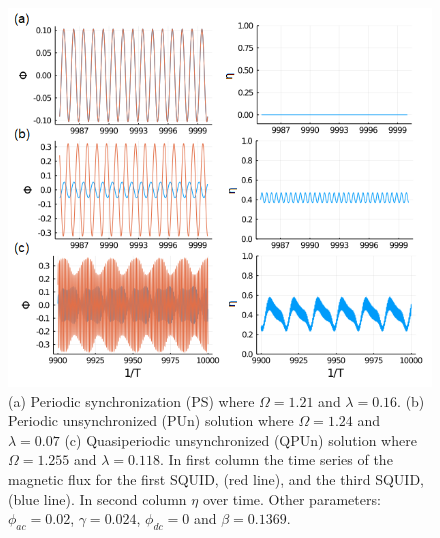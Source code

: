 \documentclass[aps,pre,reprint,groupedaddress]{revtex4-1}
\begin{document}
 


\begin{figure}
	\includegraphics[scale=0.55]{Fig04_A}%
	\caption{(a) Periodic synchronization (PS) where $\Omega = 1.21$ and $\lambda=0.16$. (b) Periodic unsynchronized (PUn) solution where $\Omega = 1.24$ and $\lambda=0.07$ (c) Quasiperiodic unsynchronized (QPUn) solution where $\Omega = 1.255$ and $\lambda=0.118$. In first column the time series of the magnetic flux for the first SQUID, (red line), and the third SQUID, (blue line). In second column $\eta$ over time. Other parameters: $\phi_{ac}=0.02$, $\gamma=0.024$, $\phi_{dc}=0$ and $\beta=0.1369$.} \label{fig04}
\end{figure}
\end{document}
